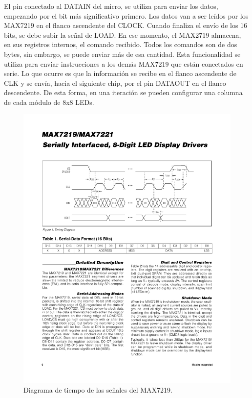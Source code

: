 El pin conectado al DATAIN del micro, se utiliza para enviar los datos, empezando por el bit más significativo primero. Los datos van a ser leídos por los MAX7219 en el flanco ascendente del CLOCK. Cuando finaliza el envío de los 16 bits, se debe subir la señal de LOAD. En ese momento, el MAX2719 almacena, en sus registros internos, el comando recibido. Todos los comandos son de dos bytes, sin embargo, se puede enviar más de esa cantidad. Esta funcionalidad se utiliza para enviar instrucciones a los demás MAX7219 que están conectados en serie. Lo que ocurre es que la información se recibe en el flanco ascendente de CLK y se envía, hacia el siguiente chip, por el pin DATAOUT en el flanco descendente. De esta forma, en una iteración se pueden configurar una columna de cada módulo de 8x8 LEDs.

\begin{figure}[ht!]
	\centering
	\begin{center}
		\includegraphics[width=\textwidth]{imagenes/hw/timingDiagram.pdf}
		\caption{Diagrama de tiempo de las señales del MAX7219.}
		\label{fig:spi-timing-diagram}
	\end{center}
\end{figure}
